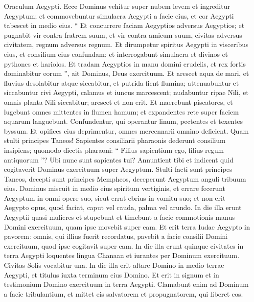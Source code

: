 \begin{biblechapter}
\begin{biblechapter}
\begin{biblechapter}
\begin{biblechapter}
\begin{biblechapter}
\begin{biblechapter}
\begin{biblechapter}
\begin{biblechapter}
\begin{biblechapter}
\begin{biblechapter}
\begin{biblechapter}
\begin{biblechapter}
\begin{biblechapter}
\begin{biblechapter}
\begin{biblechapter}
\begin{biblechapter}
\begin{biblechapter}
\begin{biblechapter}
\begin{biblechapter}
\verse Oraculum Aegypti.
 Ecce Dominus vehitur super nubem levem
 et ingreditur Aegyptum;
 et commovebuntur simulacra Aegypti a facie eius,
 et cor Aegypti tabescet in medio eius.
 \verse “ Et concurrere faciam Aegyptios adversus Aegyptios;
 et pugnabit vir contra fratrem suum,
 et vir contra amicum suum,
 civitas adversus civitatem,
 regnum adversus regnum.
 \verse Et dirumpetur spiritus Aegypti in visceribus eius,
 et consilium eius confundam;
 et interrogabunt simulacra et divinos
 et pythones et hariolos.
 \verse Et tradam Aegyptios in manu domini crudelis,
 et rex fortis dominabitur eorum ”,
 ait Dominus, Deus exercituum.
 \verse Et arescet aqua de mari,
 et fluvius desolabitur atque siccabitur,
 \verse et putrida fient flumina;
 attenuabuntur et siccabuntur rivi Aegypti,
 calamus et iuncus marcescent;
 \verse nudabuntur ripae Nili,
 et omnis planta Nili siccabitur;
 arescet et non erit.
 \verse Et maerebunt piscatores,
 et lugebunt omnes mittentes in flumen hamum;
 et expandentes rete super faciem aquarum languebunt.
 \verse Confundentur, qui operantur linum,
 pectentes et texentes byssum.
 \verse Et opifices eius deprimentur,
 omnes mercennarii omnino deficient.
 \verse Quam stulti principes Taneos!
 Sapientes consiliarii pharaonis dederunt consilium insipiens;
 quomodo dicetis pharaoni:
 “ Filius sapientium ego, filius regum antiquorum ”?
 \verse Ubi nunc sunt sapientes tui?
 Annuntient tibi et indicent
 quid cogitaverit Dominus exercituum super Aegyptum.
 \verse Stulti facti sunt principes Taneos,
 decepti sunt principes Mempheos,
 deceperunt Aegyptum anguli tribuum eius.
 \verse Dominus miscuit in medio eius spiritum vertiginis,
 et errare fecerunt Aegyptum in omni opere suo,
 sicut errat ebrius in vomitu suo;
 \verse et non erit Aegypto opus,
 quod faciat, caput vel cauda, palma vel arundo.
 \verse In die illa erunt Aegyptii quasi mulieres et stupebunt et timebunt a facie commotionis manus Domini exercituum, quam ipse movebit super eam. 
\verse Et erit terra Iudae Aegypto in pavorem: omnis, qui illius fuerit recordatus, pavebit a facie consilii Domini exercituum, quod ipse cogitavit super eam.
 \verse In die illa erunt quinque civitates in terra Aegypti loquentes lingua Chanaan et iurantes per Dominum exercituum. Civitas Solis vocabitur una.
 \verse In die illa erit altare Domino in medio terrae Aegypti, et titulus iuxta terminum eius Domino. 
\verse Et erit in signum et in testimonium Domino exercituum in terra Aegypti. Clamabunt enim ad Dominum a facie tribulantium, et mittet eis salvatorem et propugnatorem, qui liberet eos. 

\end{biblechapter}
\end{biblechapter}
\end{biblechapter}
\end{biblechapter}
\end{biblechapter}
\end{biblechapter}
\end{biblechapter}
\end{biblechapter}
\end{biblechapter}
\end{biblechapter}
\end{biblechapter}
\end{biblechapter}
\end{biblechapter}
\end{biblechapter}
\end{biblechapter}
\end{biblechapter}
\end{biblechapter}
\end{biblechapter}
\end{biblechapter}
